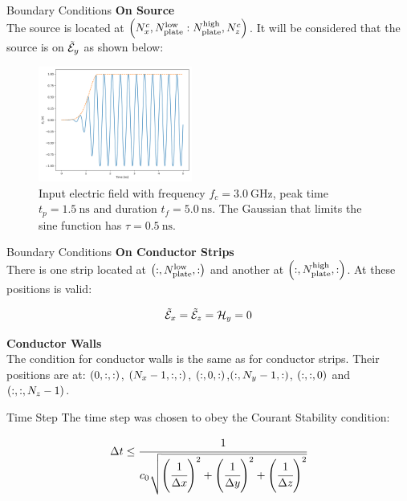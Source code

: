 \documentclass{beamer}
\begin{document}
\begin{frame}{Boundary Conditions}
  \textbf{On Source} \\
  The source is located at $\pare{N_x^c, N_{\textnormal{plate}}^{\textnormal{low}} : N_{\textnormal{plate}}^{\textnormal{high}}, N_z^c}$. It will be considered that the source is on $\tilde{\mathcal{E}}_y$ as shown below: 

  \begin{figure}[H]
      \centering
      \includegraphics[width=0.45\textwidth]{../contents/input_source.png}
      \caption{Input electric field with frequency $f_c = \SI{3.0}{\giga\hertz}$, peak time $t_p = \SI{1.5}{\nano\second}$ and duration $t_f = \SI{5.0}{\nano\second}$. The Gaussian that limits the sine function has $\tau = \SI{0.5}{\nano\second}$.}
  \end{figure}
\end{frame}

\begin{frame}{Boundary Conditions}
  \textbf{On Conductor Strips} \\

  There is one strip located at $\pare{:, N_{\textnormal{plate}}^{\textnormal{low}}, :}$ and another at $\pare{:, N_{\textnormal{plate}}^{\textnormal{high}}, :}$. At these positions is valid:

  \begin{align}
      \tilde{\mathcal{E}}_x = \tilde{\mathcal{E}}_z = \mathcal{H}_y = 0
  \end{align}

  \textbf{Conductor Walls} \\

  The condition for conductor walls is the same as for conductor strips. Their positions are at: $\pare{0, :, :}$, $\pare{N_x-1, :, :}$, $\pare{:, 0, :}$,$\pare{:, N_y-1, :}$, $\pare{:, :, 0}$ and $\pare{:, :, N_z-1}$.
\end{frame}

\begin{frame}{Time Step}
  The time step was chosen to obey the Courant Stability condition:

  \begin{equation}
      \dt \leq \cfrac{1}{c_0\sqrt{\pare{\cfrac{1}{\dx}}^2 + \pare{\cfrac{1}{\dy}}^2 + \pare{\cfrac{1}{\dz}}^2}}
  \end{equation}
\end{frame}
\end{document}
